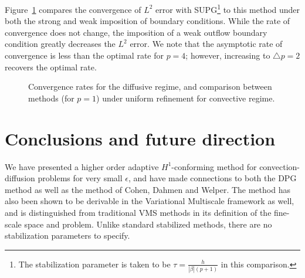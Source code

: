 \documentclass[final,leqno]{siamltex}
\newcommand{\LRb}[1]{\left| #1 \right|}
\begin{document}
Figure~\ref{fig:supg_comparison} compares the convergence of $L^2$ error with SUPG\footnote{The stabilization parameter is taken to be $\tau = \frac{h}{\LRb{\beta}(p+1)}$ in this comparison.} to this method under both the strong and weak imposition of boundary conditions.  While the rate of convergence does not change, the imposition of a weak outflow boundary condition greatly decreases the $L^2$ error.  We note that the asymptotic rate of convergence is less than the optimal rate for $p=4$; however, increasing to $\triangle p = 2$ recovers the optimal rate.  
\begin{figure}
\centering
{}
\caption{Convergence rates for the diffusive regime, and comparison between methods (for $p=1$) under uniform refinement for convective regime.}
\label{fig:supg_comparison}
\end{figure}	

\section{Conclusions and future direction}

We have presented a higher order adaptive $H^1$-conforming method for convection-diffusion problems for very small $\epsilon$, and have made connections to both the DPG method as well as the method of Cohen, Dahmen and Welper.  The method has also been shown to be derivable in the Variational Multiscale framework as well, and is distinguished from traditional VMS methods in its definition of the fine-scale space and problem.  Unlike standard stabilized methods, there are no stabilization parameters to specify.  %
\end{document}

